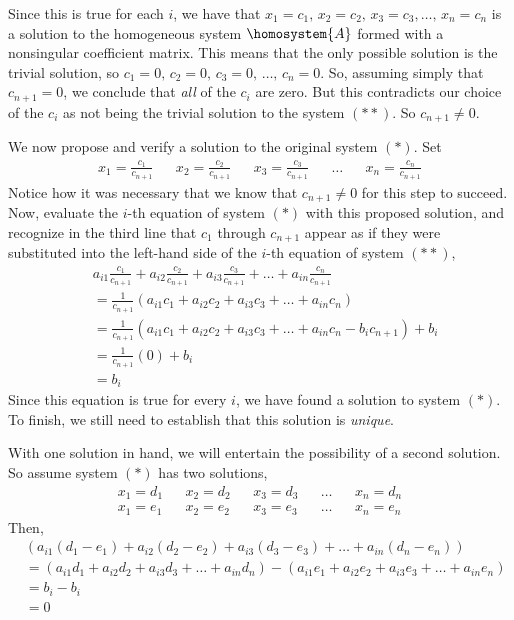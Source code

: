 %
Since this is true for each $i$, we have that $x_1=c_1,\,x_2=c_2,\,x_3=c_3,\ldots,\,x_n=c_n$ is a solution to the homogeneous system $\homosystem{A}$ formed with a nonsingular coefficient matrix.  This means that the only possible solution is the trivial solution, so $c_1=0,\,c_2=0,\,c_3=0,\,\ldots,\,c_n=0$.  So, assuming simply that $c_{n+1}=0$, we conclude that {\em all} of the $c_i$ are zero.  But this contradicts our choice of the $c_i$ as not being the trivial solution to the system $(**)$.  So $c_{n+1}\neq 0$.\par
%
We now propose and verify a solution to the original system $(*)$.  Set
%
\begin{align*}
x_1=\frac{c_1}{c_{n+1}}&&x_2=\frac{c_2}{c_{n+1}}&&x_3=\frac{c_3}{c_{n+1}}&&\ldots&&x_n=\frac{c_n}{c_{n+1}}
\end{align*}
%
Notice how it was necessary that we know that $c_{n+1}\neq 0$ for this step to succeed.  Now, evaluate the $i$-th equation of system $(*)$ with this proposed solution, and recognize in the third line that $c_1$ through $c_{n+1}$  appear as if they were substituted into the left-hand side of the $i$-th equation of system $(**)$,
%
\begin{align*}
&a_{i1}\frac{c_1}{c_{n+1}}+a_{i2}\frac{c_2}{c_{n+1}}+a_{i3}\frac{c_3}{c_{n+1}}+\dots+a_{in}\frac{c_n}{c_{n+1}}\\
&=\frac{1}{c_{n+1}}\left(a_{i1}c_1+a_{i2}c_2+a_{i3}c_3+\dots+a_{in}c_n\right)\\
&=\frac{1}{c_{n+1}}\left(a_{i1}c_1+a_{i2}c_2+a_{i3}c_3+\dots+a_{in}c_n-b_ic_{n+1}\right)+b_i\\
&=\frac{1}{c_{n+1}}\left(0\right)+b_i\\
&=b_i
\end{align*}
%
Since this equation is true for every $i$, we have found a solution to system $(*)$.  To finish, we still need to establish that this solution is {\em unique}.\par
%
With one solution in hand, we will entertain the possibility of a second solution.  So assume system $(*)$ has two solutions,
%
\begin{align*}
x_1=d_1&&x_2=d_2&&x_3=d_3&&\ldots&&x_n=d_n\\
x_1=e_1&&x_2=e_2&&x_3=e_3&&\ldots&&x_n=e_n
\end{align*}
%
Then,
%
\begin{align*}
&\left(a_{i1}(d_1-e_1)+a_{i2}(d_2-e_2)+a_{i3}(d_3-e_3)+\dots+a_{in}(d_n-e_n)\right)\\
&=\left(a_{i1}d_1+a_{i2}d_2+a_{i3}d_3+\dots+a_{in}d_n\right)-\left(a_{i1}e_1+a_{i2}e_2+a_{i3}e_3+\dots+a_{in}e_n\right)\\
&=b_i-b_i\\
&=0
\end{align*}
